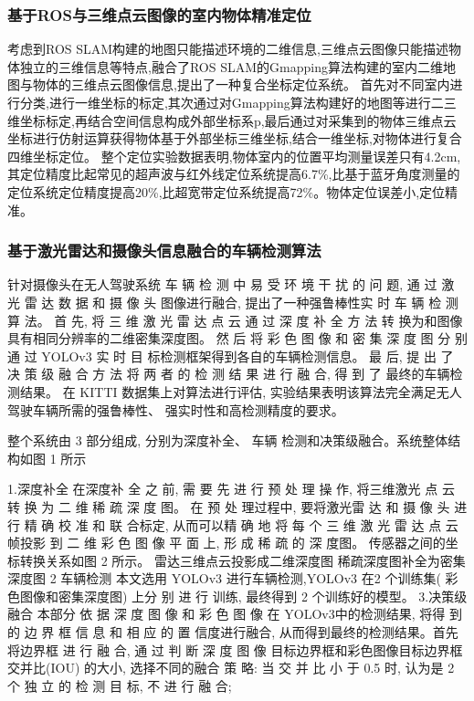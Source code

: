 \message{ !name(\unexpanded{数据融合}.tex)}\documentclass{amsart}
\begin{document}
\subsubsection{基于ROS与三维点云图像的室内物体精准定位}
考虑到ROS SLAM构建的地图只能描述环境的二维信息,三维点云图像只能描述物体独立的三维信息等特点,\cite{于洋}融合了ROS SLAM的Gmapping算法构建的室内二维地图与物体的三维点云图像信息,提出了一种复合坐标定位系统。
首先对不同室内进行分类,进行一维坐标的标定,其次通过对Gmapping算法构建好的地图等进行二三维坐标标定,再结合空间信息构成外部坐标系p,最后通过对采集到的物体三维点云坐标进行仿射运算获得物体基于外部坐标三维坐标,结合一维坐标,对物体进行复合四维坐标定位。
整个定位实验数据表明,物体室内的位置平均测量误差只有4.2cm,其定位精度比起常见的超声波与红外线定位系统提高6.7\%,比基于蓝牙角度测量的定位系统定位精度提高20\%,比超宽带定位系统提高72\%。物体定位误差小,定位精准。

\subsubsection{基于激光雷达和摄像头信息融合的车辆检测算法}
针对摄像头在无人驾驶系统 车 辆 检 测 中 易 受 环 境 干 扰 的 问 题, 通 过 激 光 雷 达 数 据 和 摄 像 头 图像进行融合, 提出了一种强鲁棒性实 时 车 辆 检 测 算 法。
首 先, 将 三 维 激 光 雷 达 点 云 通 过 深 度 补 全 方 法 转 换为和图像具有相同分辨率的二维密集深度图。
然 后 将 彩 色 图 像 和 密 集 深 度 图 分 别 通 过 YOLOv3 实 时 目 标检测框架得到各自的车辆检测信息。
最 后, 提 出 了 决 策 级 融 合 方 法 将 两 者 的 检 测 结 果 进 行 融 合, 得 到 了 最终的车辆检测结果。
在 KITTI 数据集上对算法进行评估, 实验结果表明该算法完全满足无人驾驶车辆所需的强鲁棒性、 强实时性和高检测精度的要求。

整个系统由 3 部分组成, 分别为深度补全、 车辆
检测和决策级融合。系统整体结构如图 1 所示

1.深度补全
在深度补 全 之 前, 需 要 先 进 行 预 处 理 操 作, 将三维激光 点 云 转 换 为 二 维 稀 疏 深 度 图。
在 预 处 理过程中, 要将激光雷 达 和 摄 像 头 进 行 精 确 校 准 和 联
合标定, 从而可以精 确 地 将 每 个 三 维 激 光 雷 达 点 云帧投影 到 二 维 彩 色 图 像 平 面 上, 形 成 稀 疏 的 深 度图。
传感器之间的坐标转换关系如图 2 所示。
雷达三维点云投影成二维深度图
稀疏深度图补全为密集深度图
2 车辆检测
本文选用 YOLOv3 进行车辆检测,YOLOv3 在2 个训练集( 彩色图像和密集深度图) 上分 别 进 行 训练, 最终得到 2 个训练好的模型。
3.决策级融合
本部分 依 据 深 度 图 像 和 彩 色 图 像 在 YOLOv3中的检测结果, 将得 到 的 边 界 框 信 息 和 相 应 的 置 信度进行融合, 从而得到最终的检测结果。首先将边界框 进 行 融 合, 通 过 判 断 深 度 图 像 目标边界框和彩色图像目标边界框交并比(IOU) 的大小, 选择不同的融合 策 略: 当 交 并 比 小 于 0.5 时, 认为是 2 个 独 立 的 检 测 目 标, 不 进 行 融 合;
\end{document}
